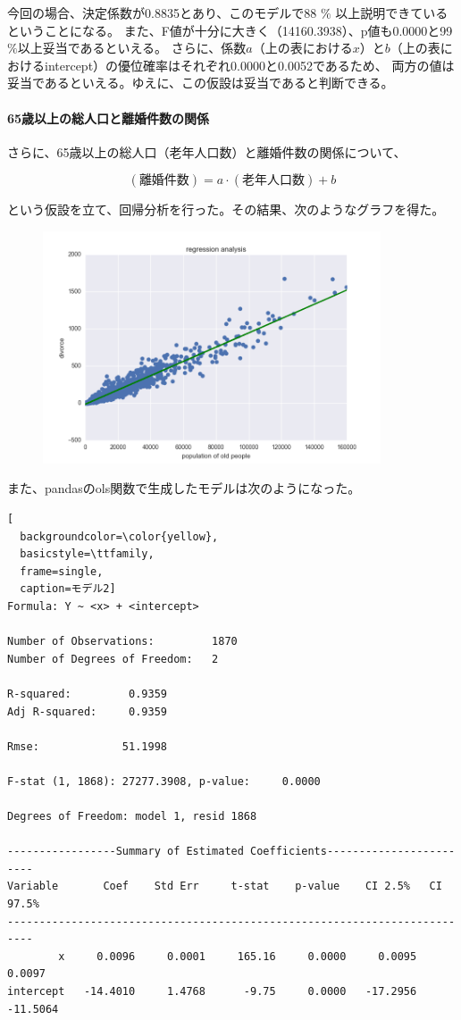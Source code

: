 \documentclass[a4paper,xelatex,ja=standard,jafont=hiragino-pron, 10pt]{bxjsarticle}
\begin{document}
今回の場合、決定係数が0.8835とあり、このモデルで88 $\%$ 以上説明できているということになる。
また、F値が十分に大きく（14160.3938）、p値も0.0000と99$\%$以上妥当であるといえる。
さらに、係数$a$（上の表における$x$）と$b$（上の表におけるintercept）の優位確率はそれぞれ0.0000と0.0052であるため、
両方の値は妥当であるといえる。ゆえに、この仮設は妥当であると判断できる。

\paragraph{65歳以上の総人口と離婚件数の関係}

さらに、65歳以上の総人口（老年人口数）と離婚件数の関係について、

\begin{equation}
  (\mbox{離婚件数}) = a \cdot (\mbox{老年人口数}) + b
\end{equation}

という仮設を立て、回帰分析を行った。その結果、次のようなグラフを得た。

\begin{figure}[ht]
  \centering
  \includegraphics[clip, width=10.0cm]{../data/picture/regression_od.png}
  \caption{}
  \label{}
\end{figure}

また、pandasのols関数で生成したモデルは次のようになった。

\begin{lstlisting}[
  backgroundcolor=\color{yellow},
  basicstyle=\ttfamily,
  frame=single,
  caption=モデル2]
Formula: Y ~ <x> + <intercept>

Number of Observations:         1870
Number of Degrees of Freedom:   2

R-squared:         0.9359
Adj R-squared:     0.9359

Rmse:             51.1998

F-stat (1, 1868): 27277.3908, p-value:     0.0000

Degrees of Freedom: model 1, resid 1868

-----------------Summary of Estimated Coefficients------------------------
Variable       Coef    Std Err     t-stat    p-value    CI 2.5%   CI 97.5%
--------------------------------------------------------------------------
        x     0.0096     0.0001     165.16     0.0000     0.0095     0.0097
intercept   -14.4010     1.4768      -9.75     0.0000   -17.2956   -11.5064
\end{lstlisting}
\end{document}
